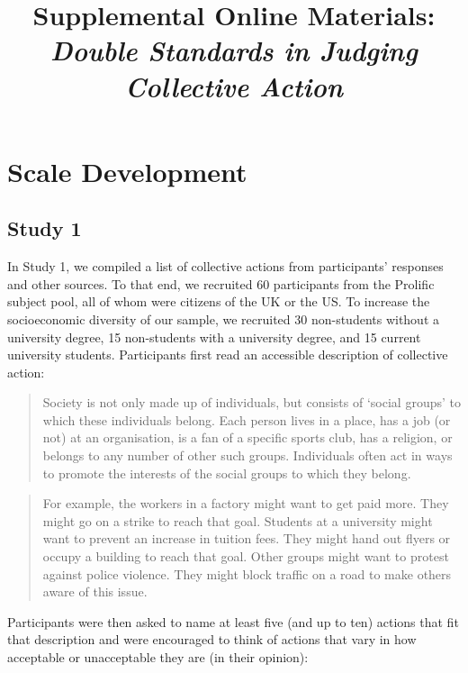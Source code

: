 \documentclass[12pt, letterpaper]{article}
\title{ Supplemental Online Materials:\\\textit{Double Standards in
Judging Collective Action} }
\author{  }
\begin{document}
\maketitle

\hypertarget{scale-development}{%
\section{Scale Development}\label{scale-development}}

\hypertarget{study-1}{%
\subsection{Study 1}\label{study-1}}

In Study 1, we compiled a list of collective actions from participants'
responses and other sources. To that end, we recruited 60 participants
from the Prolific subject pool, all of whom were citizens of the UK or
the US. To increase the socioeconomic diversity of our sample, we
recruited 30 non-students without a university degree, 15 non-students
with a university degree, and 15 current university students.
Participants first read an accessible description of collective action:

\begin{quote}
Society is not only made up of individuals, but consists of `social
groups' to which these individuals belong. Each person lives in a place,
has a job (or not) at an organisation, is a fan of a specific sports
club, has a religion, or belongs to any number of other such groups.
Individuals often act in ways to promote the interests of the social
groups to which they belong.
\end{quote}

\begin{quote}
For example, the workers in a factory might want to get paid more. They
might go on a strike to reach that goal. Students at a university might
want to prevent an increase in tuition fees. They might hand out flyers
or occupy a building to reach that goal. Other groups might want to
protest against police violence. They might block traffic on a road to
make others aware of this issue.
\end{quote}

\noindent Participants were then asked to name at least five (and up to
ten) actions that fit that description and were encouraged to think of
actions that vary in how acceptable or unacceptable they are (in their
opinion):
\end{document}
